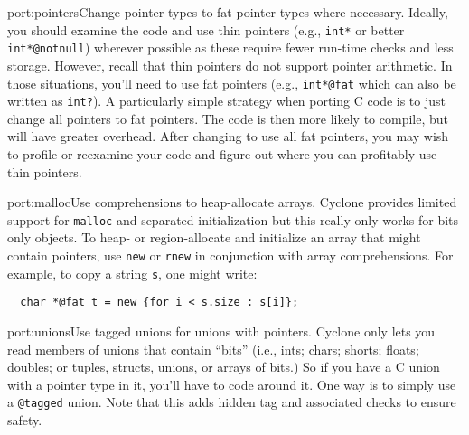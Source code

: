 \begin{porta}{port:pointers}{Change pointer types to fat pointer types where necessary.}  
Ideally, you should examine the code and use thin pointers (e.g., \texttt{int*}
or better \texttt{int*@notnull}) wherever possible as these require fewer
run-time checks and less storage.  However, recall that thin pointers
do not support pointer arithmetic.  In those situations, you'll need
to use fat pointers (e.g., \texttt{int*@fat} which can also be written
as \texttt{int?}).  A particularly simple strategy 
when porting C code is to just change all pointers to fat pointers.
The code is then more likely to compile, but will have greater overhead.
After changing to use all fat pointers, you may wish to profile or reexamine
your code and figure out where you can profitably use thin pointers.
\end{porta}

\begin{porta}{port:malloc}{Use comprehensions to heap-allocate arrays.}
Cyclone provides limited support for \texttt{malloc} and separated
initialization but this really only works for bits-only objects.
To heap- or region-allocate and initialize an array that might contain
pointers, use
\texttt{new} or \texttt{rnew} in conjunction with array comprehensions.  
For example, to copy a string \texttt{s}, one might write:
\begin{verbatim}
  char *@fat t = new {for i < s.size : s[i]};
\end{verbatim}
\end{porta}

\begin{porta}{port:unions}{Use tagged unions for unions with pointers.}
Cyclone only lets you read members of unions that 
contain ``bits'' (i.e., ints; chars;
shorts; floats; doubles; or tuples, structs, unions, or arrays of bits.)
So if you have a C union with a pointer type in it, you'll have to
code around it.  One way is to simply use a \texttt{@tagged} union.
Note that this adds hidden tag and associated checks to ensure safety.
\end{porta}

